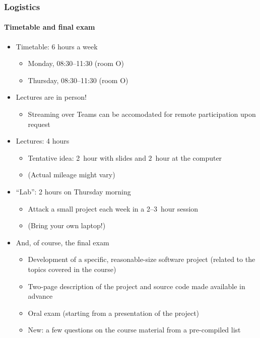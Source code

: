 \documentclass[9pt]{beamer}
\begin{document}
\begin{frame}
  \frametitle{Logistics}
  \framesubtitle{Timetable and final exam}
  \begin{itemize}
  \item Timetable: 6 hours a week
    \begin{itemize}
    \item Monday, 08:30--11:30 (room O)
    \item Thursday, 08:30--11:30 (room O)
    \end{itemize}
  \item \alert{Lectures are in person!}
  \begin{itemize}
    \item \alert{Streaming over Teams can be accomodated for remote participation
      upon request}
  \end{itemize}
  \item Lectures: 4 hours
    \begin{itemize}
    \item Tentative idea: 2~hour with slides and $2$~hour at the computer
    \item (Actual mileage might vary)
    \end{itemize}
  \item ``Lab'': 2 hours on Thursday morning
    \begin{itemize}
    \item Attack a small project each week in a 2--3~hour session
    \item (Bring your own laptop!)
    \end{itemize}
  \item And, of course, the final exam
    \begin{itemize}
    \item Development of a specific, reasonable-size software project
      (related to the topics covered in the course)
    \item Two-page description of the project and source code made
      available in advance
    \item Oral exam (starting from a presentation of the project)
    \item \alert{New: a few questions on the course material from a pre-compiled list}
    \end{itemize}
  \end{itemize}
\end{frame}
\end{document}
